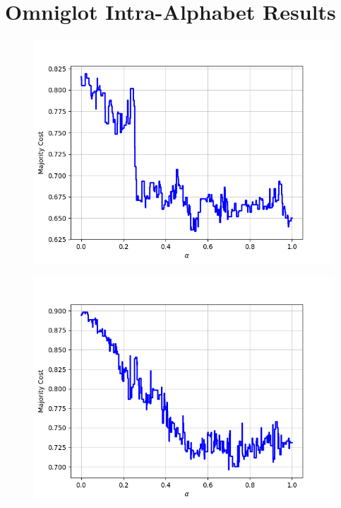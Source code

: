 \chapter{Omniglot Intra-Alphabet Results}
\label{app:omniglot}

\begin{figure}[H]
\centering
\begin{minipage}{.24\textwidth}
  \centering
  {\includegraphics[width=\linewidth]{plots/omniglot-intra-ac/Alphabet_of_the_Magi}}
\end{minipage}
\begin{minipage}{.24\textwidth}
  \centering
  {\includegraphics[width=\linewidth]{plots/omniglot-intra-ac/Anglo-Saxon_Futhorc}}

\end{minipage}
\end{figure}
